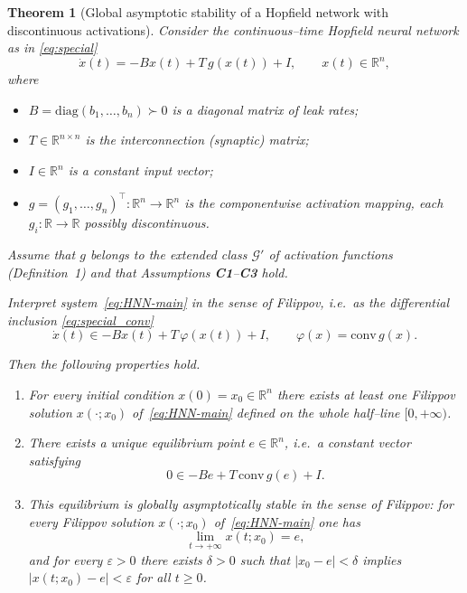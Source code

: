 \documentclass[journal]{IEEEtran}
\newtheorem{theorem}{Theorem}
\begin{document}
\begin{theorem}[Global asymptotic stability of a Hopfield network with discontinuous activations]\label{thm:main}
Consider the continuous–time Hopfield neural network as in \eqref{eq:special}
\begin{equation}
  \dot x(t) = -B x(t) + T\,g(x(t)) + I, \qquad x(t)\in\mathbb{R}^n,
  \label{eq:HNN-main}
\end{equation}
where
\begin{itemize}
  \item $B = \mathrm{diag}(b_1,\dots,b_n)\succ 0$ is a diagonal matrix
        of leak rates;
  \item $T\in\mathbb{R}^{n\times n}$ is the interconnection (synaptic) matrix;
  \item $I\in\mathbb{R}^n$ is a constant input vector;
  \item $g=(g_1,\dots,g_n)^{\top}:\mathbb{R}^n\to\mathbb{R}^n$ is the
        componentwise activation mapping, each
        $g_i:\mathbb{R}\to\mathbb{R}$ possibly discontinuous.
\end{itemize}
Assume that $g$ belongs to the extended class $\mathcal{G}'$ of
activation functions (Definition~1) and that Assumptions
\textbf{C1}–\textbf{C3} hold.

Interpret system~\eqref{eq:HNN-main} in the sense of Filippov, i.e.\
as the differential inclusion \eqref{eq:special_conv}
\begin{equation}\label{eq:HNN-incl}
   \dot x(t) \in -B x(t) + T\,\varphi(x(t)) + I,
   \qquad \varphi(x)=\mathrm{conv}\,g(x).
\end{equation}

Then the following properties hold.
\begin{enumerate}
  \item For every initial condition $x(0)=x_0\in\mathbb{R}^n$ there
        exists at least one Filippov solution $x(\cdot;x_0)$
        of~\eqref{eq:HNN-main} defined on the whole half–line
        $[0,+\infty)$.

  \item There exists a unique equilibrium point $e\in\mathbb{R}^n$,
        i.e.\ a constant vector satisfying
        \[
           0 \in -B e + T\,\mathrm{conv}\,g(e) + I .
        \]

  \item This equilibrium is \emph{globally asymptotically stable in
        the sense of Filippov}: for every Filippov solution
        $x(\cdot;x_0)$ of~\eqref{eq:HNN-main} one has
        \[
           \lim_{t\to+\infty} x(t;x_0) = e ,
        \]
        and for every $\varepsilon>0$ there exists $\delta>0$ such
        that $|x_0-e|<\delta$ implies $|x(t;x_0)-e|<\varepsilon$ for
        all $t\ge0$.
\end{enumerate}
\end{theorem}
\end{document}
